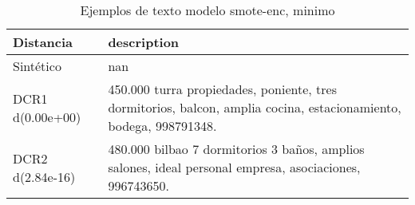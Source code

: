 \begin{table}[H]
\centering
\fontsize{10}{14}\selectfont
\caption{Ejemplos de texto modelo smote-enc, minimo}
\label{table-example-economicos-b-2-smote-enc-min-text}
\begin{tabular}{|l|m{35em}|}
\hline
\rowcolor[gray]{0.8}
Distancia & description \\
\hline Sintético & nan \\
\hline DCR1 d(0.00e+00) & 450.000 turra propiedades, poniente, tres dormitorios, balcon, amplia cocina, estacionamiento, bodega, 998791348. \\
\hline DCR2 d(2.84e-16) & 480.000 bilbao 7 dormitorios 3 ba\~nos, amplios salones, ideal personal empresa, asociaciones, 996743650. \\
\hline
\end{tabular}
\end{table}
